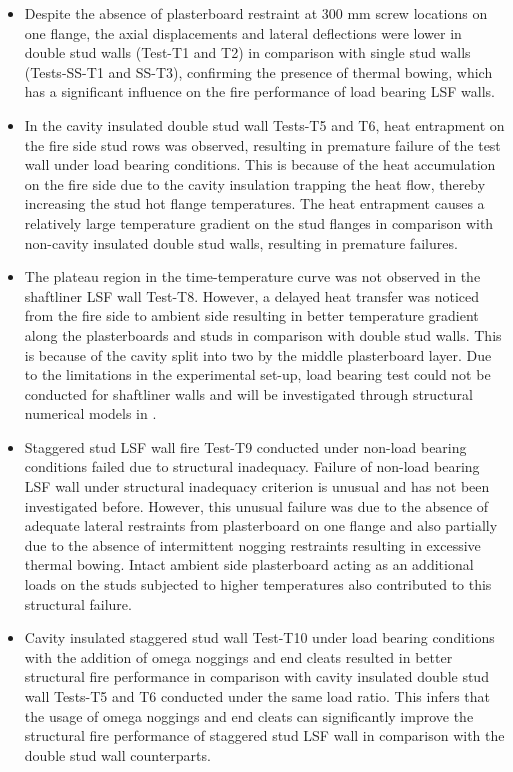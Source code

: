 \begin{itemize}
	\item Despite the absence of plasterboard restraint at 300 mm screw locations on one flange, the axial displacements and lateral deflections were lower in double stud walls (Test-T1 and T2) in comparison with single stud walls (Tests-SS-T1 and SS-T3), confirming the presence of thermal bowing, which has a significant influence on the fire performance of load bearing LSF walls.
	\item In the cavity insulated double stud wall Tests-T5 and T6, heat entrapment on the fire side stud rows was observed, resulting in premature failure of the test wall under load bearing conditions. This is because of the heat accumulation on the fire side due to the cavity insulation trapping the heat flow, thereby increasing the stud hot flange temperatures. The heat entrapment causes a relatively large temperature gradient on the stud flanges in comparison with non-cavity insulated double stud walls, resulting in premature failures.
	\item The plateau region in the time-temperature curve was not observed in the shaftliner LSF wall Test-T8. However, a delayed heat transfer was noticed from the fire side to ambient side resulting in better temperature gradient along the plasterboards and studs in comparison with double stud walls. This is because of the cavity split into two by the middle plasterboard layer. Due to the limitations in the experimental set-up, load bearing test could not be conducted for shaftliner walls and will be investigated through structural numerical models in . 
	\item Staggered stud LSF wall fire Test-T9 conducted under non-load bearing conditions failed due to structural inadequacy. Failure of non-load bearing LSF wall under structural inadequacy criterion is unusual and has not been investigated before. However, this unusual failure was due to the absence of adequate lateral restraints from plasterboard on one flange and also partially due to the absence of intermittent nogging restraints resulting in excessive thermal bowing. Intact ambient side plasterboard acting as an additional loads on the studs subjected to higher temperatures also contributed to this structural failure. 
	\item Cavity insulated staggered stud wall Test-T10 under load bearing conditions with the addition of omega noggings and end cleats resulted in better structural fire performance in comparison with cavity insulated double stud wall Tests-T5 and T6 conducted under the same load ratio. This infers that the usage of omega noggings and end cleats can significantly improve the structural fire performance of staggered stud LSF wall in comparison with the double stud wall counterparts. 

\end{itemize}
